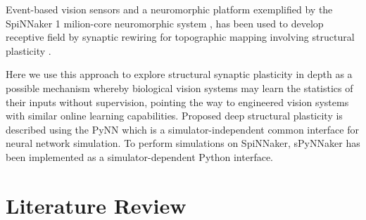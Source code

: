 \documentclass[letterpaper, 10 pt, conference]{ieeeconf}  %
\begin{document}
Event-based vision sensors \cite{gray1989oscillatory} and a neuromorphic platform exemplified by the SpiNNaker 1 milion-core neuromorphic system \cite{bogdan2018structural}, \cite{Furber2020} has been used to develop receptive field by synaptic rewiring for topographic mapping involving structural plasticity \cite{hopkins2018spiking}.

Here we use this approach to explore structural synaptic plasticity in depth as a possible mechanism whereby biological vision systems may learn the statistics of their inputs without supervision, pointing the way to engineered vision systems with similar online learning capabilities.
Proposed deep structural plasticity is described using the PyNN \cite{davison2009pynn} which is a simulator-independent common interface for neural network simulation. To perform simulations on SpiNNaker,  sPyNNaker \cite{rhodes2018spynnaker} has been implemented as a simulator-dependent Python interface.






\section{Literature Review}
\end{document}
